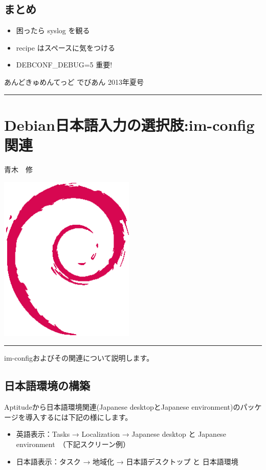 \documentclass[mingoth,a4paper]{jsarticle}
\renewcommand{\dancersection}[2]{%
\newpage
あんどきゅめんてっど でびあん 2013年夏号
%
\vspace{0.1mm}\\
{\color{dancerdarkblue}\rule{\hsize}{2mm}}

%
%
\begin{minipage}[t]{0.6\hsize}
\color{dancerdarkblue}
\vspace{1cm}
\section{#1}
\hfill{}#2\\
\end{minipage}
\begin{minipage}[t]{0.4\hsize}
\vspace{-2cm}
\hfill{}\includegraphics[height=8cm]{image200502/openlogo-nd.eps}\\
\vspace{-5cm}
\end{minipage}
%
{\color{dancerlightblue}\rule{0.66\hsize}{2mm}}
%
\vspace{2cm}
}
\begin{document}
\subsection{まとめ}
\begin{itemize}
\item 困ったら syslog を観る
\item recipe はスペースに気をつける
\item DEBCONF\_DEBUG=5 重要!
\end{itemize}

\clearpage

\dancersection{Debian日本語入力の選択肢:im-config関連}{青木　修}

im-configおよびその関連について説明します。
\subsection{日本語環境の構築}
Aptitudeから日本語環境関連(Japanese desktopとJapanese environment)のパッケージを導入するには下記の様にします。
\begin{itemize}
\item 英語表示：Tasks → Localization → Japanese desktop と Japanese environment　（下記スクリーン例）
\item 日本語表示：タスク → 地域化 → 日本語デスクトップ と 日本語環境
\end{itemize}
\end{document}
